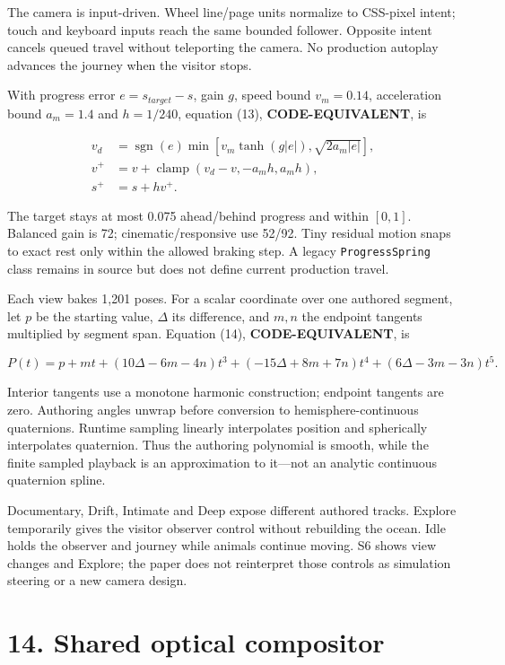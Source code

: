 \documentclass[
  english,
  11pt,
]{article}
\begin{document}
The camera is input-driven. Wheel line/page units normalize to CSS-pixel
intent; touch and keyboard inputs reach the same bounded follower.
Opposite intent cancels queued travel without teleporting the camera. No
production autoplay advances the journey when the visitor stops.

With progress error \(e=s_{target}-s\), gain \(g\), speed bound
\(v_m=0.14\), acceleration bound \(a_m=1.4\) and \(h=1/240\), equation
(13), \textbf{CODE-EQUIVALENT}, is

\[
\begin{aligned}
v_d&=\operatorname{sgn}(e)\min[v_m\tanh(g|e|),\sqrt{2a_m|e|}],\\
v^+&=v+\operatorname{clamp}(v_d-v,-a_mh,a_mh),\\
s^+&=s+hv^+.
\end{aligned}
\]

The target stays at most 0.075 ahead/behind progress and within
\([0,1]\). Balanced gain is 72; cinematic/responsive use 52/92. Tiny
residual motion snaps to exact rest only within the allowed braking
step. A legacy \texttt{ProgressSpring} class remains in source but does
not define current production travel.

Each view bakes 1,201 poses. For a scalar coordinate over one authored
segment, let \(p\) be the starting value, \(\Delta\) its difference, and
\(m,n\) the endpoint tangents multiplied by segment span. Equation (14),
\textbf{CODE-EQUIVALENT}, is

\[
P(t)=p+mt+(10\Delta-6m-4n)t^3
 +(-15\Delta+8m+7n)t^4+(6\Delta-3m-3n)t^5.
\]

Interior tangents use a monotone harmonic construction; endpoint
tangents are zero. Authoring angles unwrap before conversion to
hemisphere-continuous quaternions. Runtime sampling linearly
interpolates position and spherically interpolates quaternion. Thus the
authoring polynomial is smooth, while the finite sampled playback is an
approximation to it---not an analytic continuous quaternion spline.

Documentary, Drift, Intimate and Deep expose different authored tracks.
Explore temporarily gives the visitor observer control without
rebuilding the ocean. Idle holds the observer and journey while animals
continue moving. S6 shows view changes and Explore; the paper does not
reinterpret those controls as simulation steering or a new camera
design.

\section{14. Shared optical compositor}\label{shared-optical-compositor}
\end{document}
